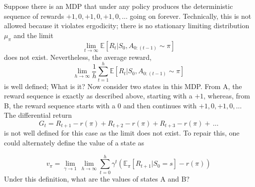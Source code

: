 Suppose there is an MDP that under any policy produces the deterministic
sequence of rewards $+1, 0, +1, 0, +1, 0, \dotso$ going on forever. Technically, this is not allowed
because it violates ergodicity; there is no stationary limiting distribution $\mu_{\pi}$ and the limit
$$\underset{t\rightarrow \infty}{\lim} \mathbb{E}[R_{t} | S_{0}, A_{0:(t-1)} \sim \pi]$$
does not exist. Nevertheless, the average reward,
$$\underset{h\rightarrow \infty} {\lim}\frac{1}{h} \sum_{t=1}^{h}\mathbb{E}[R_{t} | S_{0}, A_{0:(t-1)} \sim \pi]$$
is well defined;
What is it? Now consider two states in this MDP. From A, the reward sequence is exactly as described above, starting with a $+1$, whereas, from B, the reward sequence starts with a $0$ and then continues with $+1, 0, +1, 0,\dotso $ The differential return
$$G_{t} = R_{t+1} - r(\pi) + R_{t+2} - r(\pi) + R_{t+3} - r(\pi) + \, \dotso$$
is not well defined for this case as the limit does not exist. To repair this, one could alternately define the value of a state as

$$ v_{\pi} = \underset{\gamma \rightarrow 1}{\lim}\, \underset{h \rightarrow \infty}{\lim} \sum_{t=0}^{h} \gamma^{t}\left(  \mathbb{E}_{\pi} [R_{t+1} | S_{0} = s] - r(\pi)\right)$$
Under this definition, what are the values of states A and B?